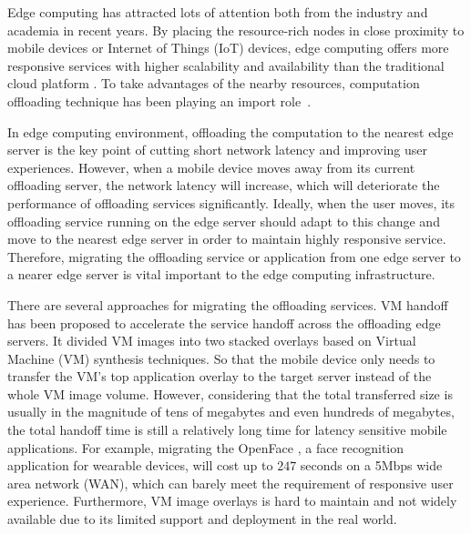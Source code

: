 
Edge computing has attracted lots of attention both from the industry and academia in recent years\cite{satya2009case,  MEC2014initiative, MEC2015-5G, yi2015fog,yi2015survey,shi2016edge,chiang2016fog,satya2017edge}.
By placing the resource-rich nodes in close proximity to mobile devices or Internet of Things (IoT) devices, edge computing offers more responsive services with higher scalability and availability than the traditional cloud platform \cite{MEC2014initiative,satya2017edge}.
To take advantages of the nearby resources, computation offloading technique has been playing an import role~\cite{cuervo2010maui,lane2016deepx,openface2016,liu2016paradrop}.

In edge computing environment, offloading the computation to the nearest edge server is the key point of cutting short network latency and improving user experiences. 
However, when a mobile device moves away from its current offloading server, the network latency will increase, which will deteriorate the performance of offloading services significantly. Ideally, when the user moves, its offloading service running on the edge server should adapt to this change and move to the nearest edge server in order to maintain highly responsive service. 
Therefore, migrating the offloading service or application from one edge server to a nearer edge server is vital important to the edge computing infrastructure. 

There are several approaches for migrating the offloading services. 
VM handoff \cite{ha2015vmhandoff} has been proposed to accelerate the service handoff across the offloading edge servers. It divided VM images into two stacked overlays based on Virtual Machine (VM) synthesis \cite{satya2009case} techniques. 
So that the mobile device only needs to transfer the VM's top application overlay to the target server instead of the whole VM image volume. However, considering that the total transferred size is usually in the magnitude of tens of megabytes and even hundreds of megabytes, the total handoff time is still a relatively long time for latency sensitive mobile applications. For example, migrating the OpenFace \cite{openface2016}, a face recognition application for wearable devices, will cost up to $247$ seconds on a 5Mbps wide area network (WAN), which can barely meet the requirement of responsive user experience. 
Furthermore, VM image overlays is hard to maintain and not widely available due to its limited support and deployment in the real world.

